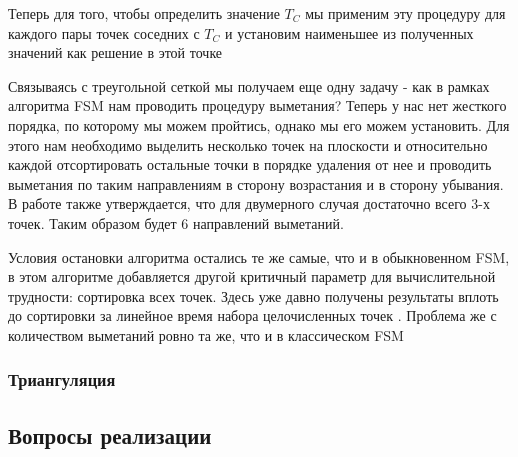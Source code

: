 Теперь для того, чтобы определить значение $T_C$ мы применим эту
процедуру для каждого пары точек соседних с $T_C$ и установим
наименьшее из полученных значений как решение в этой точке

Связываясь с треугольной сеткой мы получаем еще одну задачу - как в
рамках алгоритма FSM нам проводить процедуру выметания? Теперь у нас
нет жесткого порядка, по которому мы можем пройтись, однако мы его
можем установить. Для этого нам необходимо выделить несколько точек на
плоскости и относительно каждой  отсортировать остальные точки в порядке
удаления от нее и проводить выметания по таким направлениям в сторону
возрастания и в сторону убывания. В работе \cite{FS2007} также
утверждается, что для двумерного случая достаточно всего 3-х
точек. Таким образом будет 6 направлений выметаний.

Условия остановки алгоритма остались те же самые, что и в обыкновенном
FSM, в этом алгоритме добавляется другой критичный параметр для
вычислительной трудности: сортировка всех точек. Здесь уже давно
получены результаты вплоть до сортировки за линейное время набора
целочисленных точек \cite{K2017}. Проблема же с количеством выметаний
ровно та же, что и в классическом FSM



\subsubsection{Триангуляция}
\label{sec:triangulate}

\subsection{Вопросы реализации}
\label{sec:programming}




